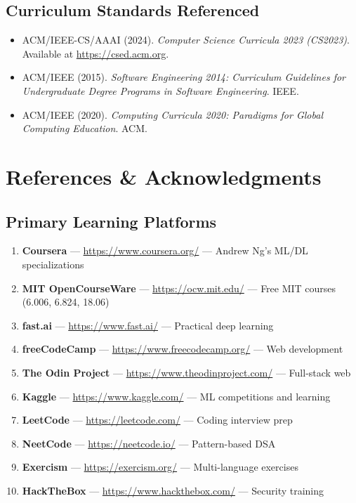 \documentclass[11pt, a4paper, oneside]{report}
\begin{document}
{{{{{{{{{{{{\section*{Curriculum Standards Referenced}

\begin{itemize}[leftmargin=*]
\item ACM/IEEE-CS/AAAI (2024). \emph{Computer Science Curricula 2023 (CS2023)}. Available at \url{https://csed.acm.org}.
\item ACM/IEEE (2015). \emph{Software Engineering 2014: Curriculum Guidelines for Undergraduate Degree Programs in Software Engineering}. IEEE.
\item ACM/IEEE (2020). \emph{Computing Curricula 2020: Paradigms for Global Computing Education}. ACM.
\end{itemize}


\chapter*{References \& Acknowledgments}

\section*{Primary Learning Platforms}

\begin{enumerate}[leftmargin=*]
\item \textbf{Coursera} --- \url{https://www.coursera.org/} --- Andrew Ng's ML/DL specializations
\item \textbf{MIT OpenCourseWare} --- \url{https://ocw.mit.edu/} --- Free MIT courses (6.006, 6.824, 18.06)
\item \textbf{fast.ai} --- \url{https://www.fast.ai/} --- Practical deep learning
\item \textbf{freeCodeCamp} --- \url{https://www.freecodecamp.org/} --- Web development
\item \textbf{The Odin Project} --- \url{https://www.theodinproject.com/} --- Full-stack web
\item \textbf{Kaggle} --- \url{https://www.kaggle.com/} --- ML competitions and learning
\item \textbf{LeetCode} --- \url{https://leetcode.com/} --- Coding interview prep
\item \textbf{NeetCode} --- \url{https://neetcode.io/} --- Pattern-based DSA
\item \textbf{Exercism} --- \url{https://exercism.org/} --- Multi-language exercises
\item \textbf{HackTheBox} --- \url{https://www.hackthebox.com/} --- Security training
\end{enumerate}

}}}}}}}}}}}}
\end{document}
